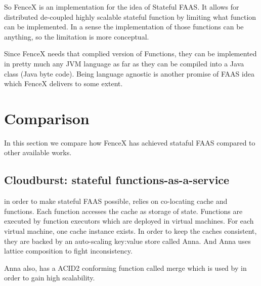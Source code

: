 \documentclass[a4]{report}
\begin{document}
    So FenceX is an implementation for the idea of Stateful FAAS.
    It allows for distributed de-coupled highly scalable stateful function by limiting what function can be implemented.
    In a sense the implementation of those functions can be anything, so the limitation is more conceptual.

    Since FenceX needs that complied version of Functions, they can be implemented in pretty much any JVM language as
    far as they can be compiled into a Java class (Java byte code).
    Being language agnostic is another promise of FAAS idea which FenceX delivers to some extent.


    \section{Comparison}
    In this section we compare how FenceX has achieved stataful FAAS compared to other available works.

    \subsection{Cloudburst: stateful functions-as-a-service}
    \cite{Functions-as-a-Service-2020} in order to make stateful FAAS possible, relies on co-locating cache and
    functions.
    Each function accesses the cache as storage of state.
    Functions are executed by function executors which are deployed in virtual machines.
    For each virtual machine, one cache instance exists.
    In order to keep the caches consistent, they are backed by an auto-scaling key:value store called Anna.
    And Anna uses lattice composition to fight inconsistency.

    Anna also, has a ACID2 conforming function called merge which is used by \cite{Functions-as-a-Service-2020} in
    order to gain high scalability.
\end{document}
